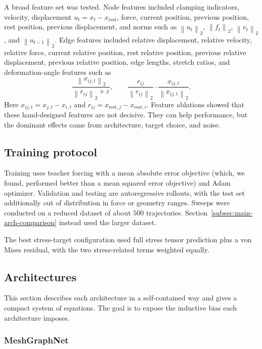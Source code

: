 \documentclass[11pt,a4paper,reqno]{amsart}
\theoremstyle{definition}
\theoremstyle{remark}
\numberwithin{equation}{section}
\newcommand{\norm}[1]{\left\lVert #1 \right\rVert}
\begin{document}
A broad feature set was tested. Node features included clamping indicators, velocity, displacement $u_t=x_t-x_{\mathrm{rest}}$, force, current position, previous position, rest position, previous displacement, and norms such as $\norm{u_t}_2$, $\norm{f_t}_2$, $\norm{v_t}_2$, and $\norm{u_{t-1}}_2$. Edge features included relative displacement, relative velocity, relative force, current relative position, rest relative position, previous relative displacement, previous relative position, edge lengths, stretch ratios, and deformation-angle features such as
\begin{equation}
    \frac{\norm{x_{ij,t}}_2}{\norm{r_{ij}}_2+\varepsilon},
    \qquad
    \frac{r_{ij}}{\norm{r_{ij}}_2}\cdot \frac{x_{ij,t}}{\norm{x_{ij,t}}_2}.
\end{equation}
Here $x_{ij,t}=x_{j,t}-x_{i,t}$ and $r_{ij}=x_{\mathrm{rest},j}-x_{\mathrm{rest},i}$. Feature ablations showed that these hand-designed features are not decisive. They can help performance, but the dominant effects came from architecture, target choice, and noise.

\subsection{Training protocol}

Training uses teacher forcing with a mean absolute error objective (which, we found, performed better than a mean squared error objective) and Adam optimizer. Validation and testing are autoregressive rollouts, with the test set additionally out of distribution in force or geometry ranges. Sweeps were conducted on a reduced dataset of about $500$ trajectories. Section~\ref{subsec:main-arch-comparison} instead used the larger dataset. 

The best stress-target configuration used full stress tensor prediction plus a von Mises residual, with the two stress-related terms weighted equally.

\subsection{Architectures}

This section describes each architecture in a self-contained way and gives a compact system of equations. The goal is to expose the inductive bias each architecture imposes.

\subsubsection{MeshGraphNet}
\end{document}
